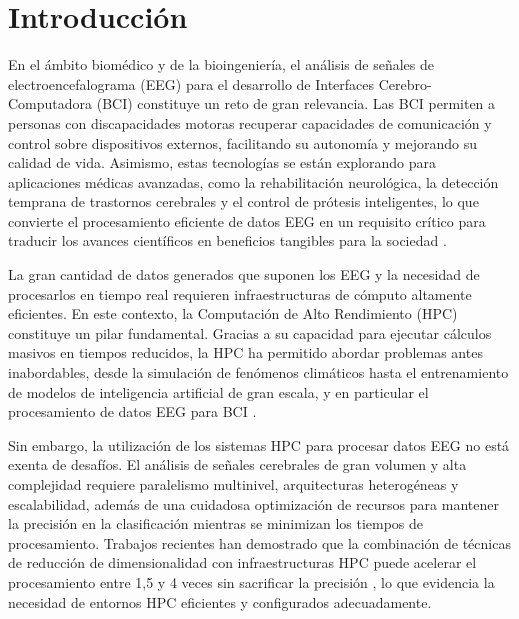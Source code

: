 \chapter{Introducción}\label{cap:introduccion}



En el ámbito biomédico y de la bioingeniería, el análisis de señales de electroencefalograma (\acs{EEG}) para el desarrollo de Interfaces Cerebro-Computadora (\acs{BCI}) constituye un reto de gran relevancia. Las \acs{BCI} permiten a personas con discapacidades motoras recuperar capacidades de comunicación y control sobre dispositivos externos, facilitando su autonomía y mejorando su calidad de vida. Asimismo, estas tecnologías se están explorando para aplicaciones médicas avanzadas, como la rehabilitación neurológica, la detección temprana de trastornos cerebrales y el control de prótesis inteligentes, lo que convierte el procesamiento eficiente de datos \acs{EEG} en un requisito crítico para traducir los avances científicos en beneficios tangibles para la sociedad \cite{mcfarland2017eeg, Lotte2015ElectroencephalographyB}.

La gran cantidad de datos generados que suponen los \acs{EEG} y la necesidad de procesarlos en tiempo real requieren infraestructuras de cómputo altamente eficientes. En este contexto, la Computación de Alto Rendimiento (\acs{HPC}) constituye un pilar fundamental. Gracias a su capacidad para ejecutar cálculos masivos en tiempos reducidos, la \acs{HPC} ha permitido abordar problemas antes inabordables, desde la simulación de fenómenos climáticos hasta el entrenamiento de modelos de inteligencia artificial de gran escala, y en particular el procesamiento de datos \acs{EEG} para \acs{BCI} \cite{2025HighPerformanceCF}.

Sin embargo, la utilización de los sistemas \acs{HPC} para procesar datos \acs{EEG} no está exenta de desafíos. El análisis de señales cerebrales de gran volumen y alta complejidad requiere paralelismo multinivel, arquitecturas heterogéneas y escalabilidad, además de una cuidadosa optimización de recursos para mantener la precisión en la clasificación mientras se minimizan los tiempos de procesamiento. Trabajos recientes han demostrado que la combinación de técnicas de reducción de dimensionalidad con infraestructuras \acs{HPC} puede acelerar el procesamiento entre 1,5 y 4 veces sin sacrificar la precisión \cite{mcfarland2017eeg, Lotte2015ElectroencephalographyB, 2025HighPerformanceCF}, lo que evidencia la necesidad de entornos \acs{HPC} eficientes y configurados adecuadamente.

